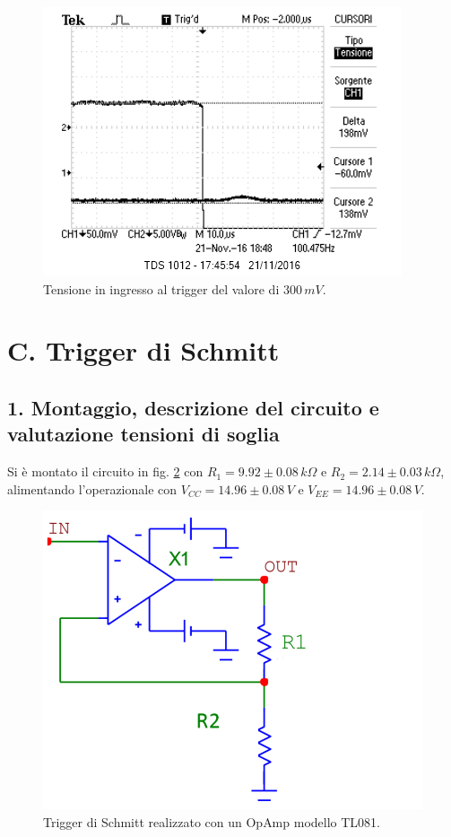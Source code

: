 \documentclass[10pt,a4paper]{article}
\begin{document}
\begin{figure}[h]
\centering
\includegraphics[scale=1.0]{immagini/morto.png}
\caption{Tensione in ingresso al trigger del valore di $300 \, mV$.}
\label{morto}
\end{figure}

\section*{C. Trigger di Schmitt}
\subsection{1. Montaggio, descrizione del circuito e valutazione tensioni di soglia}
Si è montato il circuito in fig. \ref{circuito3} con $R_1 = 9.92\pm0.08 \, k\Omega$ e $R_2 = 2.14 \pm 0.03 \, k\Omega$, alimentando l'operazionale con $V_{CC} = 14.96\pm0.08 \, V$ e $V_{EE} = 14.96 \pm 0.08 \, V$.\\

\begin{figure}[h]
\centering
\includegraphics[scale=0.5]{triggerSchmitt.png}
\caption{Trigger di Schmitt realizzato con un OpAmp modello TL081.\label{circuito3}}
\end{figure}
\end{document}
